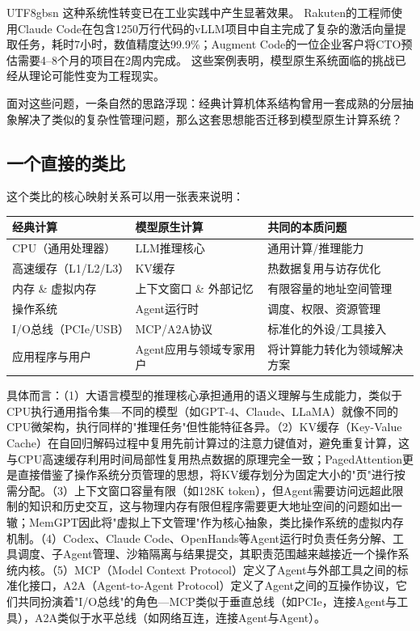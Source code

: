 \documentclass[11pt,a4paper]{article}
\begin{document}
\begin{CJK*}{UTF8}{gbsn}
这种系统性转变已在工业实践中产生显著效果。
Rakuten的工程师使用Claude Code在包含1250万行代码的vLLM项目中自主完成了复杂的激活向量提取任务，耗时7小时，数值精度达99.9\%；Augment Code的一位企业客户将CTO预估需要4--8个月的项目在2周内完成\cite{anthropic2026agenticreport}。
这些案例表明，模型原生系统面临的挑战已经从理论可能性变为工程现实。

面对这些问题，一条自然的思路浮现：经典计算机体系结构曾用一套成熟的分层抽象解决了类似的复杂性管理问题，那么这套思想能否迁移到模型原生计算系统？

\subsection{一个直接的类比}

这个类比的核心映射关系可以用一张表来说明：

\begin{center}
\begin{tabular}{lll}
\hline
\textbf{经典计算} & \textbf{模型原生计算} & \textbf{共同的本质问题} \\
\hline
CPU（通用处理器） & LLM推理核心 & 通用计算/推理能力 \\
高速缓存（L1/L2/L3） & KV缓存 & 热数据复用与访存优化 \\
内存 \& 虚拟内存 & 上下文窗口 \& 外部记忆 & 有限容量的地址空间管理 \\
操作系统 & Agent运行时 & 调度、权限、资源管理 \\
I/O总线（PCIe/USB） & MCP/A2A协议 & 标准化的外设/工具接入 \\
应用程序与用户 & Agent应用与领域专家用户 & 将计算能力转化为领域解决方案 \\
\hline
\end{tabular}
\end{center}

具体而言：（1）大语言模型的推理核心承担通用的语义理解与生成能力，类似于CPU执行通用指令集---不同的模型（如GPT-4、Claude、LLaMA）就像不同的CPU微架构，执行同样的"推理任务"但性能特征各异。（2）KV缓存（Key-Value Cache）在自回归解码过程中复用先前计算过的注意力键值对，避免重复计算，这与CPU高速缓存利用时间局部性复用热点数据的原理完全一致；PagedAttention\cite{kwon2023pagedattention}更是直接借鉴了操作系统分页管理的思想，将KV缓存划分为固定大小的"页"进行按需分配。（3）上下文窗口容量有限（如128K token），但Agent需要访问远超此限制的知识和历史交互，这与物理内存有限但程序需要更大地址空间的问题如出一辙；MemGPT\cite{memgpt2023}因此将"虚拟上下文管理"作为核心抽象，类比操作系统的虚拟内存机制。（4）Codex\cite{openai_codex_overview_2026}、Claude Code\cite{anthropic_claudecode_overview_2026}、OpenHands\cite{openhands_paper_2025}等Agent运行时负责任务分解、工具调度、子Agent管理、沙箱隔离与结果提交，其职责范围越来越接近一个操作系统内核。（5）MCP（Model Context Protocol）\cite{mcp_intro_2026}定义了Agent与外部工具之间的标准化接口，A2A（Agent-to-Agent Protocol）\cite{google_a2a_2025}定义了Agent之间的互操作协议，它们共同扮演着"I/O总线"的角色---MCP类似于垂直总线（如PCIe，连接Agent与工具），A2A类似于水平总线（如网络互连，连接Agent与Agent）\cite{agentprotocols2025}。


\end{CJK*}
\end{document}
